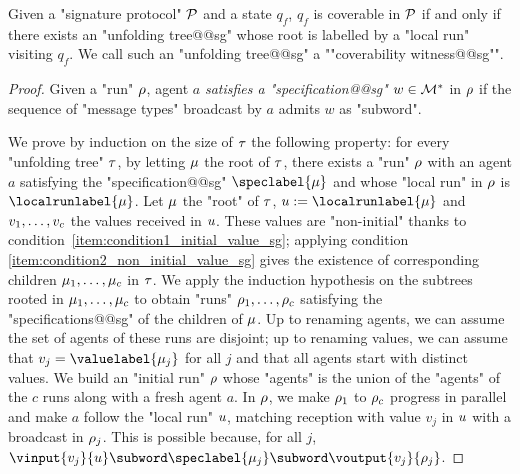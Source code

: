 \begin{lemma}
\label{lem:coverability_witness_sg}
Given a "signature protocol" $\mathcal{P}$ and a state $q_f$, $q_f$ is coverable in $\mathcal{P}$ if and only if there exists an "unfolding tree@@sg" whose root is labelled by a "local run" visiting $q_f$. We call such an "unfolding tree@@sg" a ""coverability witness@@sg"".
\end{lemma}
\begin{proof}
Given a "run" $\rho$, agent $a$ \emph{satisfies a "specification@@sg"} $w \in \mathcal{M}^*$ in $\rho$ if the sequence of "message types" broadcast by $a$ admits $w$ as "subword".%

We prove by induction on the size of $\tau$ the following property: for every "unfolding tree" $\tau$, by letting $\mu$ the root of $\tau$, there exists a "run" $\rho$ with an agent $a$ satisfying the "specification@@sg" $\speclabel{\node}$ and whose "local run" in $\rho$ is $\localrunlabel{\node}$. Let $\mu$ the "root" of $\tau$, $\localrun := \localrunlabel{\node}$ and $v_1, \dots, v_c$ the values received in $u$. These values are "non-initial" thanks to condition~\ref{item:condition1_initial_value_sg}; applying condition \ref{item:condition2_non_initial_value_sg} gives the existence of corresponding children $\mu_1, \dots, \mu_c$ in $\tau$. We apply the induction hypothesis on the subtrees rooted in $\mu_1, \dots, \mu_c$ to obtain "runs" $\rho_1, \dots, \rho_c$ satisfying the "specifications@@sg" of the children of $\mu$. Up to renaming agents, we can assume the set of agents of these runs are disjoint; up to renaming values, we can assume that $\aval_j = \valuelabel{\node_j}$ for all $j$ and that all agents start with distinct values. We build an "initial run" $\rho$ whose "agents" is the union of the "agents" of the $c$ runs along with a fresh agent $a$. In $\rho$, we make $\rho_1$ to $\rho_c$ progress in parallel and make $a$ follow the "local run" $u$, matching reception with value $v_j$ in $u$ with a broadcast in $\rho_j$. This is possible because, for all $j$, $\vinput{v_j}{\localrun} \subword \speclabel{\node_j} \subword \voutput{v_j}{\run_j}$. 


\end{proof}
